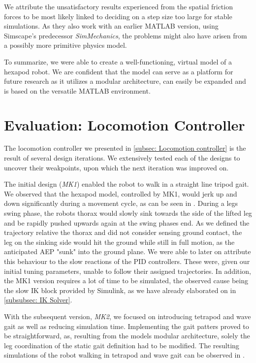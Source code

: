 We attribute the unsatisfactory results \cite{thilderkvist2015motion} experienced from the spatial friction forces to be most likely linked to deciding on a step size too large for stable simulations.
As they also work with an earlier MATLAB version, using Simscape's predecessor \textit{SimMechanics}, the problems might also have arisen from a possibly more primitive physics model.

To summarize, we were able to create a well-functioning, virtual model of a hexapod robot.
We are confident that the model can serve as a platform for future research as it utilizes a modular architecture, can easily be expanded and is based on the versatile MATLAB environment.
 

\section{Evaluation: Locomotion Controller}
The locomotion controller we presented in \ref{subsec: Locomotion controller} is the result of several design iterations.
We extensively tested each of the designs to uncover their weakpoints, upon which the next iteration was improved on.

The initial design (\textit{MK1}) enabled the robot to walk in a straight line tripod gait.
We observed that the hexapod model, controlled by MK1, would jerk up and down significantly during a movement cycle, as can be seen in \cite{Hexapod_MK1_Videos}.
During a legs swing phase, the robots thorax would slowly sink towards the side of the lifted leg and be rapidly pushed upwards again at the swing phases end.
As we defined the trajectory relative the thorax and did not consider sensing ground contact, the leg on the sinking side would hit the ground while still in full motion, as the anticipated AEP "sunk" into the ground plane.
We were able to later on attribute this behaviour to the slow reactions of the PID controllers.
These were, given our initial tuning parameters, unable to follow their assigned trajectories. 
In addition, the MK1 version requires a lot of time to be simulated, the observed cause being the slow IK block provided by Simulink, as we have already elaborated on in \ref{subsubsec: IK Solver}.

With the subsequent version, \textit{MK2}, we focused on introducing tetrapod and wave gait as well as reducing simulation time.
Implementing the gait patters proved to be straightforward, as, resulting from the models modular architecture, solely the leg coordination of the static gait definition had to be modified.
The resulting simulations of the robot walking in tetrapod and wave gait can be observed in \cite{Hexapod_MK2_Videos}.

